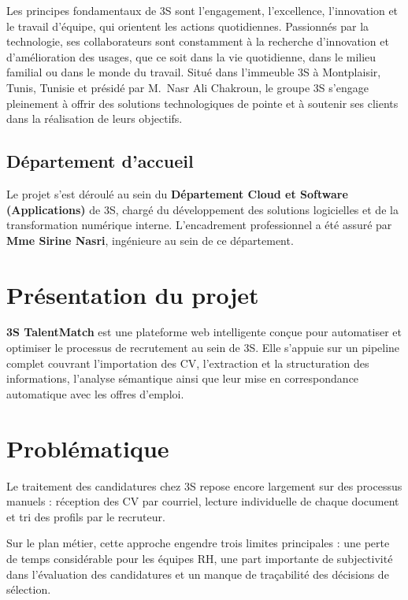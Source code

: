 \documentclass[12pt,a4paper]{report}
\begin{document}
Les principes fondamentaux de 3S sont l'engagement, l'excellence, l'innovation et le travail d'équipe, qui orientent les actions quotidiennes. Passionnés par la technologie, ses collaborateurs sont constamment à la recherche d'innovation et d'amélioration des usages, que ce soit dans la vie quotidienne, dans le milieu familial ou dans le monde du travail. Situé dans l'immeuble 3S à Montplaisir, Tunis, Tunisie et présidé par M.~Nasr Ali Chakroun, le groupe 3S s'engage pleinement à offrir des solutions technologiques de pointe et à soutenir ses clients dans la réalisation de leurs objectifs.

\subsection{Département d'accueil}

Le projet s'est déroulé au sein du \textbf{Département Cloud et Software (Applications)} de 3S, chargé du développement des solutions logicielles et de la transformation numérique interne. L'encadrement professionnel a été assuré par \textbf{Mme Sirine Nasri}, ingénieure au sein de ce département.

\section{Présentation du projet}

\textbf{3S TalentMatch} est une plateforme web intelligente conçue pour automatiser et optimiser le processus de recrutement au sein de 3S. Elle s'appuie sur un pipeline complet couvrant l'importation des CV, l'extraction et la structuration des informations, l'analyse sémantique ainsi que leur mise en correspondance automatique avec les offres d'emploi.

\section{Problématique}

Le traitement des candidatures chez 3S repose encore largement sur des processus manuels : réception des CV par courriel, lecture individuelle de chaque document et tri des profils par le recruteur.

Sur le plan métier, cette approche engendre trois limites principales : une perte de temps considérable pour les équipes RH, une part importante de subjectivité dans l'évaluation des candidatures et un manque de traçabilité des décisions de sélection.
\end{document}
